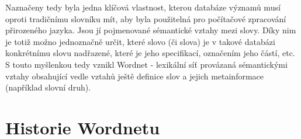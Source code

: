 \documentclass[a4paper, 11pt, oneside]{book}
\begin{document}
			Naznačeny tedy byla jedna klíčová vlastnost, kterou databáze významů musí oproti tradičnímu slovníku mít, aby byla použitelná pro počítačové zpracování přirozeného jazyka. Jsou jí pojmenované sémantické vztahy mezi slovy. Díky nim je totiž možno jednoznačně určit, které slovo (či slova) je v takové databázi konkrétnímu slovu nadřazené, které je jeho specifikací, označením jeho částí, etc. S touto myšlenkou tedy vznikl Wordnet - lexikální síť provázaná sémantickými vztahy obsahující vedle vztahů ještě definice slov a jejich metainformace (například slovní druh). \parencite{pala2013vceska}

		
		\section{Historie Wordnetu}




	\printbibliography[title={Seznam literatury}]

\end{document}
